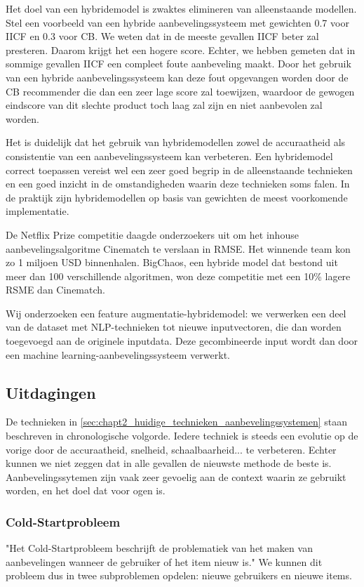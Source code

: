 Het doel van een hybridemodel is zwaktes elimineren van alleenstaande modellen. Stel een voorbeeld van een hybride aanbevelingssysteem met gewichten 0.7 voor IICF en 0.3 voor CB. We weten dat in de meeste gevallen IICF beter zal presteren. Daarom krijgt het een hogere score. Echter, we hebben gemeten dat in sommige gevallen IICF een compleet foute aanbeveling maakt. Door het gebruik van een hybride aanbevelingssysteem kan deze fout opgevangen worden door de CB recommender die dan een zeer lage score zal toewijzen, waardoor de gewogen eindscore van dit slechte product toch laag zal zijn en niet aanbevolen zal worden.

Het is duidelijk dat het gebruik van hybridemodellen zowel de accuraatheid als consistentie van een aanbevelingssysteem kan verbeteren. Een hybridemodel correct toepassen vereist wel een zeer goed begrip in de alleenstaande technieken en een goed inzicht in de omstandigheden waarin deze technieken soms falen. In de praktijk zijn hybridemodellen op basis van gewichten de meest voorkomende implementatie. \cite{hybrid_recsys_literature_overview}

De Netflix Prize competitie daagde onderzoekers uit om het inhouse aanbevelingsalgoritme Cinematch te verslaan in RMSE. Het winnende team kon zo 1 miljoen USD binnenhalen. BigChaos, een hybride model dat bestond uit meer dan 100 verschillende algoritmen, won deze competitie met een  10\% lagere RSME dan Cinematch. \cite{netflix_hybrid}

Wij onderzoeken een feature augmentatie-hybridemodel: we verwerken een deel van de dataset met NLP-technieken tot nieuwe inputvectoren, die dan worden toegevoegd aan de originele inputdata. Deze gecombineerde input wordt dan door een machine learning-aanbevelingssysteem verwerkt.

\subsection{Uitdagingen}
De technieken in \autoref{sec:chapt2_huidige_technieken_aanbevelingssystemen} staan beschreven in chronologische volgorde. Iedere techniek is steeds een evolutie op de vorige door de accuraatheid, snelheid, schaalbaarheid... te verbeteren. Echter kunnen we niet zeggen dat in alle gevallen de nieuwste methode de beste is. Aanbevelingssytemen zijn vaak zeer gevoelig aan de context waarin ze gebruikt worden, en het doel dat voor ogen is.


\subsubsection{Cold-Startprobleem}
\label{sec:chapt2_cold_start}
"Het Cold-Startprobleem beschrijft de problematiek van het maken van aanbevelingen wanneer de gebruiker of het item nieuw is." \cite{coldstart_cf} We kunnen dit probleem dus in twee subproblemen opdelen: nieuwe gebruikers en nieuwe items.

